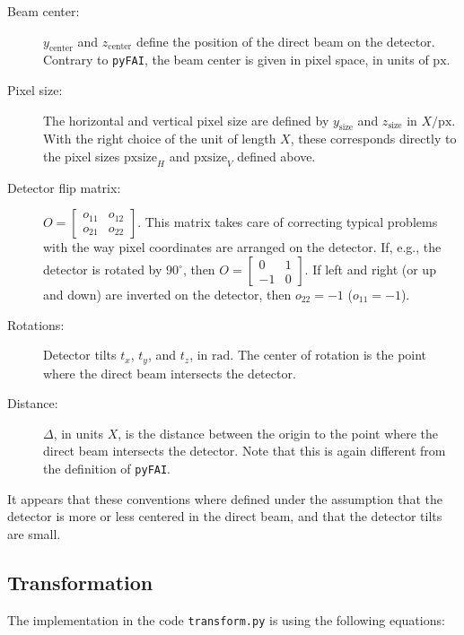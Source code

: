 \documentclass[12pt]{article}
\begin{document}
\begin{description}
\item[Beam center:] $y_{\mathrm{center}}$ and $z_{\mathrm{center}}$
  define the position of the direct beam on the detector. Contrary to
  \texttt{pyFAI}, the beam center is given in pixel space, in units of
  $\mathrm{px}$.

\item[Pixel size:] The horizontal and vertical pixel size are defined
  by $y_{\mathrm{size}}$ and $z_{\mathrm{size}}$ in
  ${X}/{\mathrm{px}}$. With the right choice of the unit of length
  $X$, these corresponds directly to the pixel sizes
  $\mathrm{pxsize}_H$ and $\mathrm{pxsize}_V$ defined above.

\item[Detector flip matrix:] $O = \begin{bmatrix} o_{11} & o_{12}
  \\ o_{21} & o_{22} \end{bmatrix}$. This matrix takes care of
  correcting typical problems with the way pixel coordinates are
  arranged on the detector. If, e.g., the detector is rotated by
  $90^{\circ}$, then $O=\begin{bmatrix} 0 & 1 \\ -1 &
  0\end{bmatrix}$. If left and right (or up and down) are inverted on
  the detector, then $o_{22} = -1$ ($o_{11}=-1$).

\item[Rotations:] Detector tilts $t_x$, $t_y$, and $t_z$, in
  $\mathrm{rad}$. The center of rotation is the point where the direct
  beam intersects the detector.

\item[Distance:] $\Delta$, in units $X$, is the distance between the origin
  to the point where the direct beam intersects the detector.  Note
  that this is again different from the definition of \texttt{pyFAI}.
\end{description}

It appears that these conventions where defined under the assumption
that the detector is more or less centered in the direct beam, and
that the detector tilts are small.

\subsection{Transformation}

The implementation in the code \texttt{transform.py} is using the
following equations:
\end{document}

